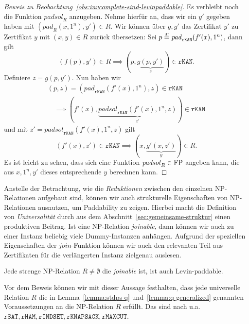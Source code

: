 \begin{proof}[Beweis zu Beobachtung~\ref{obs:invcomplete-sind-levinpaddable}]
    Es verbleibt noch die Funktion $\mathit{padsol}_R$ anzugeben. Nehme hierfür an, dass wir ein $y'$ gegeben haben mit $(\mathit{pad}_R(x, 1^n), y')\in R$.
    Wir können über $g, g'$ das Zertifikat $y'$ zu Zertifikat $y$ mit $(x, y)\in R$ zurück übersetzen:
    Sei $p\stackrel{\text{\smash{\tiny df}}}{=} \mathit{pad}_\mathtt{rKAN}(f'(x), 1^n)$, dann gilt
    \[ (f(p), y')\in R \implies (p, \underbrace{g(p, y')}_z)\in \mathtt{rKAN}. \]
    Definiere $z=g(p, y')$.
    Nun haben wir
    \begin{gather*} (p, z)=(\mathit{pad}_\mathtt{rKAN}(f'(x), 1^n), z)\in\mathtt{rKAN}  \\\quad\implies (f'(x), \underbrace{\mathit{padsol}_\mathtt{rKAN}(f'(x), 1^n, z)}_{z'})\in\mathtt{rKAN} \end{gather*}
    und mit $z'=\mathit{padsol}_\mathtt{rKAN}(f'(x), 1^n, z)$ gilt
    \[ (f'(x), z') \in \mathtt{rKAN} \implies (x, \underbrace{g'(x, z')}_{y}) \in R. \]
    Es ist leicht zu sehen, dass sich eine Funktion $\mathit{padsol}_R\in\mathrm{FP}$ angeben kann, die aus $x, 1^n, y'$ dieses entsprechende $y$ berechnen kann.
\end{proof}

Anstelle der Betrachtung, wie die \emph{Reduktionen} zwischen den einzelnen NP-Relationen aufgebaut sind, können wir auch strukturelle Eigenschaften von NP-Relationen ausnutzen, um Paddability zu zeigen. Hierbei macht die Definition von \emph{Universalität} durch \textcite{agrawal_universal_1992} aus dem Abschnitt~\ref{sec:gemeinsame-struktur} einen produktiven Beitrag. Ist eine NP-Relation \emph{joinable}, dann können wir auch zu einer Instanz beliebig viele Dummy-Instanzen anhängen. Aufgrund der speziellen Eigenschaften der $\mathit{join}$-Funktion können wir auch den relevanten Teil aus Zertifikaten für die verlängerten Instanz zielgenau auslesen. 

\begin{observation}\label{obs:joinable-sind-levinpaddable}
    Jede strenge NP-Relation $R\neq\emptyset$ die \emph{joinable} ist, ist auch Levin-paddable. 
\end{observation}
Vor dem Beweis können wir mit dieser Aussage festhalten, dass jede universelle Relation $R$ die in 
Lemma~\ref{lemma:stdps-q} und~\ref{lemma:q-generalized} genannten Voraussetzungen an die NP-Relation $R$ erfüllt.
Das sind nach \textcite{agrawal_universal_1992} u.a. $\mathtt{rSAT}, \mathtt{rHAM}, \mathtt{rINDSET}, \mathtt{rKNAPSACK}, \mathtt{rMAXCUT}$.

